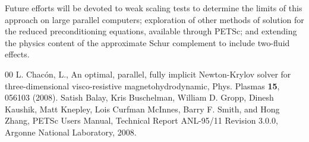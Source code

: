 \documentclass{report}
\begin{document}
Future efforts will be devoted to weak scaling tests to determine the
limits of this approach on large parallel computers; exploration of
other methods of solution for the reduced preconditioning equations,
available through PETSc; and extending the physics content of the
approximate Schur complement to include two-fluid effects.


\begin{thebibliography} {00}
L. Chac\'on, L., An optimal, parallel, fully implicit
Newton-Krylov solver for three-dimensional visco-resistive
magnetohydrodynamic, Phys. Plasmas {\bf 15}, 056103 (2008).
Satish Balay, Kris Buschelman, William D. Gropp,
Dinesh Kaushik, Matt Knepley, Lois Curfman McInnes, Barry F. Smith, and
Hong Zhang, PETSc Users Manual, Technical Report ANL-95/11 Revision
3.0.0, Argonne National Laboratory, 2008.
\end{thebibliography}
\end{document}
